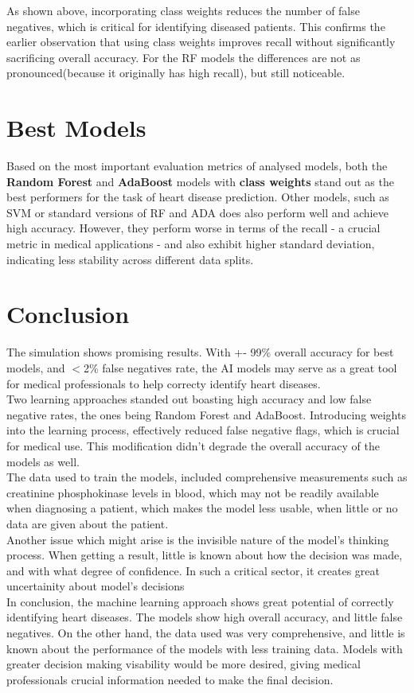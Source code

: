 \documentclass[conference]{IEEEtran}
\begin{document}
As shown above, incorporating class weights reduces the number of false negatives, which is critical
for identifying diseased patients. This confirms the earlier observation that using class weights improves recall
without significantly sacrificing overall accuracy. For the RF models the differences are not as pronounced(because
it originally has high recall), but still noticeable.

\section{Best Models}
Based on the most important evaluation metrics of analysed models, both the \textbf{Random Forest}
and \textbf{AdaBoost} models with \textbf{class weights} 
stand out as the best performers for the task of heart disease prediction. 
Other models, such as SVM or standard versions of
RF and ADA does also perform well and achieve high accuracy. However, they perform worse in terms of the recall 
- a crucial metric in medical applications -
and also exhibit higher standard deviation, indicating less stability across different data splits.

\section{Conclusion}

The simulation shows promising results. With +- 99\% overall accuracy for best models, and $<$2\% false negatives rate,
the AI models may serve as a great tool for medical professionals to help correcty identify heart diseases. \\

Two learning approaches standed out boasting high accuracy and low false negative rates, the ones being Random Forest and AdaBoost.
Introducing weights into the learning process, effectively reduced false negative flags, which is crucial for medical use. This
modification didn't degrade the overall accuracy of the models as well. \\

The data used to train the models, included comprehensive measurements such as creatinine phosphokinase levels
in blood, which may not be readily available when diagnosing a patient, which makes the model less usable, when
little or no data are given about the patient. \\

Another issue which might arise is the invisible nature of the model's thinking process.
When getting a result, little is known about how the decision was made, and with what degree
of confidence. In such a critical sector, it creates great uncertainity about model's decisions \\

In conclusion, the machine learning approach shows great potential of correctly identifying heart diseases.
The models show high overall accuracy, and little false negatives. On the other hand, the data used was very comprehensive,
and little is known about the performance of the models with less training data. Models with greater decision making visability
would be more desired, giving medical professionals crucial information needed to make the final decision.
\end{document}
